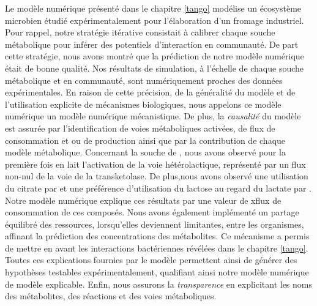 \documentclass[../main.tex]{subfiles}
\begin{document}
Le modèle numérique présenté dans le chapitre \ref{tango} modélise un écosystème microbien étudié expérimentalement pour l'élaboration d'un fromage industriel. Pour rappel, notre stratégie itérative consistait à calibrer chaque souche métabolique pour inférer des potentiels d'interaction en communauté. De part cette stratégie, nous avons montré que la prédiction de notre modèle numérique était de bonne qualité. Nos résultats de simulation, à l'échelle de chaque souche métabolique et en communauté, sont numériquement proches des données expérimentales. En raison de cette précision, de la généralité du modèle et de l'utilisation explicite de mécanismes biologiques, nous appelons ce modèle numérique un modèle numérique mécanistique. De plus, la \textit{causalité} du modèle est assurée par l'identification de voies métaboliques activées, de flux de consommation et ou de production ainsi que par la contribution de chaque modèle métabolique. Concernant la souche de \plantarum, nous avons observé pour la première fois en lait l'activation de la voie hétérolactique, représenté par un flux non-nul de la voie de la transketolase. De plus,nous avons observé une utilisation du citrate par \plantarum et une préférence d'utilisation du lactose au regard du lactate par \freud. Notre modèle numérique explique ces résultats par une valeur de xflux de consommation de ces composés. Nous avons également implémenté un partage équilibré des ressources, lorsqu'elles deviennent limitantes, entre les organismes, affinant la prédiction des concentrations des métabolites. Ce mécanisme a permis de mettre en avant les interactions bactériennes révélées dans le chapitre \ref{tango}. Toutes ces explications fournies par le modèle permettent ainsi de générer des hypothèses testables expérimentalement, qualifiant ainsi notre modèle numérique de modèle explicable. Enfin, nous assurons la \textit{transparence} en explicitant les noms des métabolites, des réactions et des voies métaboliques. \\


\end{document}
